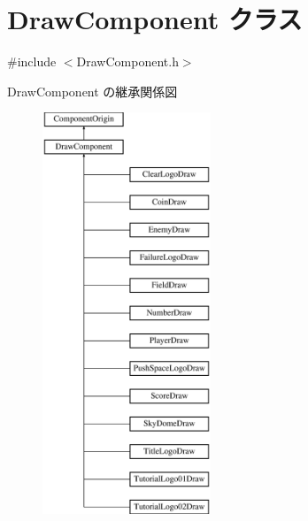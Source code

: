 \hypertarget{class_draw_component}{}\section{Draw\+Component クラス}
\label{class_draw_component}


{\ttfamily \#include $<$Draw\+Component.\+h$>$}

Draw\+Component の継承関係図\begin{figure}[H]
\begin{center}
\leavevmode
\includegraphics[height=12.000000cm]{class_draw_component}
\end{center}
\end{figure}
